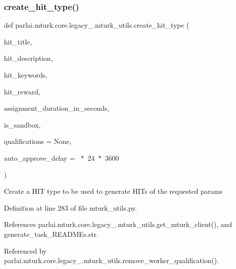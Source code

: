 \subsubsection{\texorpdfstring{create\+\_\+hit\+\_\+type()}{create\_hit\_type()}}
{\footnotesize\ttfamily def parlai.\+mturk.\+core.\+legacy\+\_.\+mturk\+\_\+utils.\+create\+\_\+hit\+\_\+type (\begin{DoxyParamCaption}\item[{}]{hit\+\_\+title,  }\item[{}]{hit\+\_\+description,  }\item[{}]{hit\+\_\+keywords,  }\item[{}]{hit\+\_\+reward,  }\item[{}]{assignment\+\_\+duration\+\_\+in\+\_\+seconds,  }\item[{}]{is\+\_\+sandbox,  }\item[{}]{qualifications = {\ttfamily None},  }\item[{}]{auto\+\_\+approve\+\_\+delay = {~$\ast$~24~$\ast$~3600} }\end{DoxyParamCaption})}

\begin{DoxyVerb}Create a HIT type to be used to generate HITs of the requested params\end{DoxyVerb}
 

Definition at line 283 of file mturk\+\_\+utils.\+py.



References parlai.\+mturk.\+core.\+legacy\+\_.\+mturk\+\_\+utils.\+get\+\_\+mturk\+\_\+client(), and generate\+\_\+task\+\_\+\+R\+E\+A\+D\+M\+Es.\+str.



Referenced by parlai.\+mturk.\+core.\+legacy\+\_.\+mturk\+\_\+utils.\+remove\+\_\+worker\+\_\+qualification().

